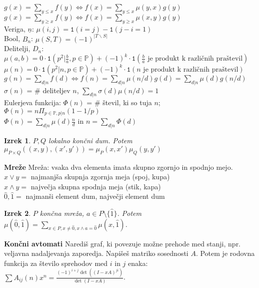 \documentclass[a4paper, oneside, 12pt]{article}
\newtheorem{izrek}{Izrek}
\theoremstyle{definition}
\begin{document}
$g(x) = \sum_{y \leq x} f(y) \iff f(x) = \sum_{y \leq x} \mu(y,x) g(y)$\\
$g(x) = \sum_{y \geq x} f(y) \iff f(x) = \sum_{y \geq x} \mu(x,y) g(y)$\\
Veriga, $\underline{n}$: $\mu(i,j) = \texttt{1}(i = j) - \texttt{1}(j-i = 1)$\\
Bool, $B_n$: $\mu(S, T) = (-1)^{|T \backslash S|}$\\
Delitelji, $D_n$: $\mu(a, b) = 0 \cdot \texttt{1}(p^2 | \frac{b}{a}, p\in \mathbb{P}) +
(-1)^k \cdot \texttt{1}(\frac{b}{a} \text{ je produkt k različnih praštevil})$\\
$\mu(n) = 0 \cdot \texttt{1}(p^2 | n, p\in \mathbb{P}) + (-1)^k
\cdot \texttt{1}(n \text{ je produkt k različnih praštevil})$\\
$g(n) = \sum_{d|n} f(d) \iff f(n) = \sum_{d|n} \mu(n/d) g(d) = \sum_{d|n} \mu(d) g(n/d)$\\
$\sigma(n)$ = \# deliteljev $n$, $\sum_{d|n} \sigma(d) \mu(n/d) = 1$\\
Eulerjeva funkcija: $\Phi(n)$ = \# števil, ki so tuja $n$; $\Phi(n) = n \Pi_{p\in \mathbb{P}, p|n} (1 - 1/p)$\\
$\Phi(n)=\sum_{d|n} \mu(d) \frac{n}{d}$ in $n = \sum_{d|n} \Phi(d)$
\vspace{-2mm}
\begin{izrek}
$P, Q$ lokalno končni dum. Potem $\mu_{P \times Q}((x,y),(x',y')) = \mu_P(x,x')\mu_Q(y,y')$
\end{izrek}
\vspace{-5mm}
\textbf{Mreže}
Mreža: vsaka dva elementa imata skupno zgornjo in spodnjo mejo.\\
$x \vee y =$ najmanjša skupnja zgornja meja (spoj, kupa)\\
$x \wedge y =$ največja skupna spodnja meja (stik, kapa)\\
$\hat{0}, \hat{1} =$ najmanši element dum, največji element dum
\vspace{-2mm}
\begin{izrek}
$P$ končna mreža, $a \in P\setminus \{ \hat{1} \}$. Potem
$\mu(\hat{0},\hat{1}) = \sum_{x \in P, x \neq \hat{0}, x \wedge a =\hat{0}}\mu(x,\hat{1})$.
\end{izrek}
\vspace{-2mm}
\textbf{Končni avtomati}
Narediš graf, ki povezuje možne prehode med stanji, npr. veljavna nadaljevanja zaporedja.
Napišeš matriko sosednosti $A$. Potem je rodovna funkcija za število sprehodov med $i$ in $j$
enaka: $\sum A_{ij}(n)x^n = \frac{(-1)^{i+j} \det((I-xA)^{ji})}{\det(I-xA)}$.
\end{document}

